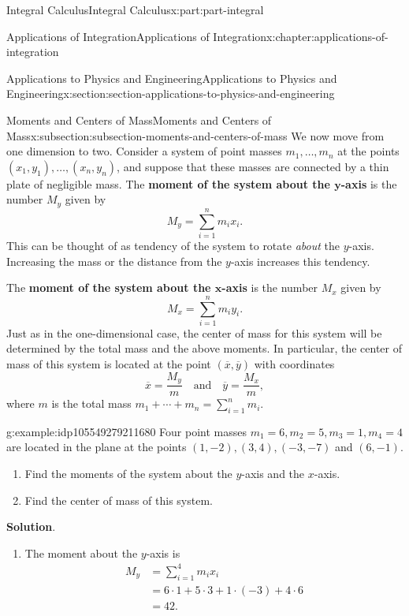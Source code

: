 \documentclass[twoside,10pt,]{book}
\newcommand{\blocktitlefont}{\relax}
\newcommand{\terminology}[1]{\textbf{#1}}
\numberwithin{equation}{part}
\newcommand{\amp}{&}
\begin{document}
\begin{partptx}{Integral Calculus}{}{Integral Calculus}{}{}{x:part:part-integral}
\begin{chapterptx}{Applications of Integration}{}{Applications of Integration}{}{}{x:chapter:applications-of-integration}
\begin{sectionptx}{Applications to Physics and Engineering}{}{Applications to Physics and Engineering}{}{}{x:section:section-applications-to-physics-and-engineering}
\begin{subsectionptx}{Moments and Centers of Mass}{}{Moments and Centers of Mass}{}{}{x:subsection:subsection-moments-and-centers-of-mass}
We now move from one dimension to two. Consider a system of point masses \(m_{1},\ldots,m_{n}\) at the points \((x_{1},y_{1}),\ldots,(x_{n},y_{n})\), and suppose that these masses are connected by a thin plate of negligible mass. The \terminology{moment of the system about the \(\boldsymbol{y}\)-axis} is the number \(M_{y}\) given by%
%
\begin{equation*}
M_{y} = \sum_{i=1}^{n}m_{i}x_{i}.
\end{equation*}
This can be thought of as tendency of the system to rotate \emph{about} the \(y\)-axis. Increasing the mass or the distance from the \(y\)-axis increases this tendency.%
\par
The \terminology{moment of the system about the \(\boldsymbol{x}\)-axis} is the number \(M_{x}\) given by%
\begin{equation*}
M_{x} = \sum_{i=1}^{n}m_{i}y_{i}.
\end{equation*}
Just as in the one-dimensional case, the center of mass for this system will be determined by the total mass and the above moments. In particular, the center of mass of this system is located at the point \((\overline{x},\overline{y})\) with coordinates%
\begin{equation*}
\overline{x} = \frac{M_{y}}{m}\quad\text{and}\quad\overline{y} = \frac{M_{x}}{m},
\end{equation*}
where \(m\) is the total mass \(m_{1}+\cdots+m_{n} = \sum_{i=1}^{n}m_{i}\).%
\begin{example}{}{g:example:idp105549279211680}%
Four point masses \(m_{1} = 6,m_{2} = 5,m_{3} = 1,m_{4} = 4\) are located in the plane at the points \((1,-2),(3,4),(-3,-7)\) and \((6,-1)\).%
\begin{enumerate}
\item{}Find the moments of the system about the \(y\)-axis and the \(x\)-axis.%
\item{}Find the center of mass of this system.%
\end{enumerate}
%
\par\smallskip%
\noindent\textbf{\blocktitlefont Solution}.\hypertarget{g:solution:idp105549279215136}{}\quad{}%
\begin{enumerate}
\item{}The moment about the \(y\)-axis is%
\begin{align*}
M_{y}\amp= \sum_{i=1}^{4}m_{i}x_{i}\\
\amp= 6\cdot1+5\cdot3+1\cdot(-3)+4\cdot6\\
\amp= 42.
\end{align*}

\end{enumerate}
\end{example}
\end{subsectionptx}
\end{sectionptx}
\end{chapterptx}
\end{partptx}
\end{document}
